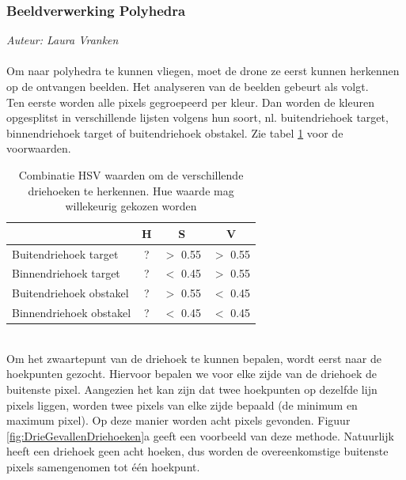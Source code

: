 \subsubsection{Beeldverwerking Polyhedra}
{\em Auteur: Laura Vranken}
\\
\\
\noindent
Om naar polyhedra te kunnen vliegen, moet de drone ze eerst kunnen herkennen op de ontvangen beelden. Het analyseren van de beelden gebeurt als volgt. 
\\
Ten eerste worden alle pixels gegroepeerd per kleur. Dan worden de kleuren opgesplitst in verschillende lijsten volgens hun soort, nl. buitendriehoek target, binnendriehoek target of buitendriehoek obstakel. Zie tabel \ref{table: HSVwaarden} voor de voorwaarden.
\begin{table}[h]
	\centering
\begin{tabular}{ l | c | c | c }
	 & H & S & V\\\hline
	Buitendriehoek target & ? & \(>\) 0.55 & \(>\) 0.55 \\
	Binnendriehoek target & ? & \(<\) 0.45 & \(>\) 0.55 \\
	Buitendriehoek obstakel & ? & \(>\) 0.55 & \(<\) 0.45 \\
	Binnendriehoek obstakel & ? & \(<\) 0.45 & \(<\) 0.45\\
\end{tabular}
\caption{\label{table: HSVwaarden}Combinatie HSV waarden om de verschillende driehoeken te herkennen. Hue waarde mag willekeurig gekozen worden}
\end{table}
\\
Om het zwaartepunt van de driehoek te kunnen bepalen, wordt eerst naar de hoekpunten gezocht. Hiervoor bepalen we voor elke zijde van de driehoek de buitenste pixel. Aangezien het kan zijn dat twee hoekpunten op dezelfde lijn pixels liggen, worden twee pixels van elke zijde bepaald (de minimum en maximum pixel). Op deze manier worden acht pixels gevonden. Figuur \ref{fig:DrieGevallenDriehoeken}a geeft een voorbeeld van deze methode. Natuurlijk heeft een driehoek geen acht hoeken, dus worden de overeenkomstige buitenste pixels samengenomen tot één hoekpunt. 
